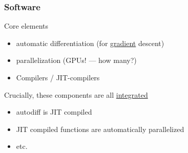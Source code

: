 \documentclass[
    xcolor={svgnames,dvipsnames},
    hyperref={colorlinks, citecolor=DeepPink4, linkcolor=DarkRed, urlcolor=DarkBlue}
    ]{beamer}  %
\newcommand{\1}{\mathbbm 1}
\begin{document}
\begin{frame}
    \frametitle{Software}
    
    \begin{figure}
       \begin{center}
       \end{center}
    \end{figure}


\end{frame}

\begin{frame}
    

    Core elements
    \begin{itemize}
        \item automatic differentiation (for \underline{gradient} descent)
        \vspace{0.5em}
        \item parallelization (GPUs! --- how many?)
        \vspace{0.5em}
        \item Compilers / JIT-compilers
    \end{itemize}

        \vspace{0.5em}
        \vspace{0.5em}
        \pause
    Crucially, these components are all \underline{integrated}

    \begin{itemize}
        \item autodiff is JIT compiled
        \vspace{0.5em}
        \item JIT compiled functions are automatically parallelized
        \vspace{0.5em}
        \item etc.
    \end{itemize}

\end{frame}
\end{document}
